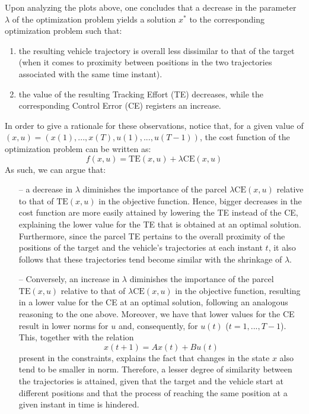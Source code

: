 \documentclass[12pt]{article}
\begin{document}
Upon analyzing the plots above, one concludes that a decrease in the parameter $\lambda$ of the optimization problem yields a solution $x^*$ to the corresponding optimization problem such that:
\begin{enumerate}
    \item the resulting vehicle trajectory is overall less dissimilar to that of the target (when it comes to proximity between positions in the two trajectories associated with the same time instant).
    \item the value of the resulting Tracking Effort (TE) decreases, while the corresponding Control Error (CE) registers an increase.
\end{enumerate}
In order to give a rationale for these observations, notice that, for a given value of $(x, u) = (x(1), ..., x(T), u(1), ..., u(T - 1))$, the cost function of the optimization problem can be written as:
\vspace{-0.2em}
\[
    f(x, u) = \text{TE}(x, u) + \lambda \text{CE}(x, u)
\]
As such, we can argue that:
\begin{itemize}
    \item[--] a decrease in $\lambda$ diminishes the importance of the parcel $\lambda \text{CE}(x, u)$ relative to that of $\text{TE}(x, u)$ in the objective function. Hence, bigger decreases in the cost function are more easily attained by lowering the TE instead of the CE, explaining the lower value for the TE that is obtained at an optimal solution. Furthermore, since the parcel TE pertains to the overall proximity of the positions of the target and the vehicle's trajectories at each instant $t$, it also follows that these trajectories tend become similar with the shrinkage of $\lambda$.
    \item[--] Conversely, an increase in $\lambda$ diminishes the importance of the parcel $\text{TE}(x, u)$ relative to that of $\lambda \text{CE}(x, u)$ in the objective function, resulting in a lower value for the CE at an optimal solution, following an analogous reasoning to the one above. Moreover, we have that lower values for the CE result in lower norms for $u$ and, consequently, for $u(t)$ ($t = 1, ..., T-1$). This, together with the relation
    \[
        x(t + 1) = Ax(t) + Bu(t)
    \]
    present in the constraints, explains the fact that changes in the state $x$ also tend to be smaller in norm. Therefore, a lesser degree of similarity between the trajectories is attained, given that the target and the vehicle start at different positions and that the process of reaching the same position at a given instant in time is hindered.
\end{itemize}
\end{document}
